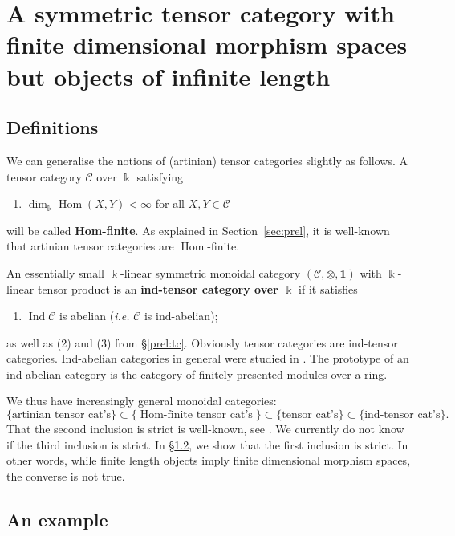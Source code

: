 \documentclass[11pt]{amsart}
\def\dim{\operatorname{dim}}
\def\Ind{\operatorname{Ind}}
\def\Hom{\operatorname{Hom}}
\def\Cs{\mathscr{C}}
\def\cC{\mathscr{C}}
\def\bk{\Bbbk}
\theoremstyle{definition}
\theoremstyle{remark}
\numberwithin{equation}{section}
\newcommand{\unit}{\mathbf{1}}
\begin{document}
\appendix

\section{A symmetric tensor category with finite dimensional morphism spaces but objects of infinite length}\label{App}

\subsection{Definitions}

We can generalise the notions of (artinian) tensor categories slightly as follows. A tensor category $\Cs$ over $\bk$ satisfying
\begin{enumerate}
    \item[(4')] $\dim_{\bk}\Hom(X,Y)<\infty$ for all $X,Y\in\cC$ 
\end{enumerate}
will be called {\bf Hom-finite}. As explained in Section~\ref{sec:prel}, it is well-known that artinian tensor categories are $\Hom$-finite.

An essentially small $\bk$-linear symmetric monoidal category $(\cC,\otimes,\unit)$ with $\bk$-linear tensor product is an {\bf ind-tensor category over $\bk$} if it satisfies
\begin{enumerate}
\item[(1')] $\Ind\cC$ is abelian ({\it i.e.} $\cC$ is ind-abelian);
\end{enumerate}
as well as (2) and (3) from \S\ref{prel:tc}. Obviously tensor categories are ind-tensor categories. Ind-abelian categories in general were studied in \cite{Sch}. The prototype of an ind-abelian category is the category of finitely presented modules over a ring.



We thus have increasingly general monoidal categories:
    $$\{\mbox{artinian tensor cat's}\}\subset\{\mbox{$\Hom$-finite tensor cat's}\}\subset \{\mbox{tensor cat's}\}\subset \{\mbox{ind-tensor cat's}\}.$$
    That the second inclusion is strict is well-known, see \cite[\S 2.9]{Del90}. We currently do not know if the third inclusion is strict.
    In \S\ref{App:Ex}, we show that the first inclusion is strict. In other words, while finite length objects imply finite dimensional morphism spaces, the converse is not true.



\subsection{An example}\label{App:Ex}
\end{document}

